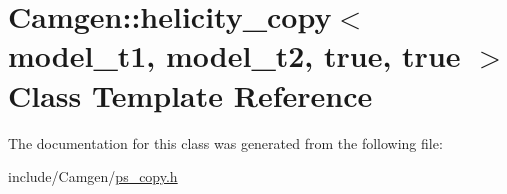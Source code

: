 \hypertarget{a00269}{}\section{Camgen\+:\+:helicity\+\_\+copy$<$ model\+\_\+t1, model\+\_\+t2, true, true $>$ Class Template Reference}
\label{a00269}


The documentation for this class was generated from the following file\+:\begin{DoxyCompactItemize}
\item 
include/\+Camgen/\hyperlink{a00740}{ps\+\_\+copy.\+h}\end{DoxyCompactItemize}
